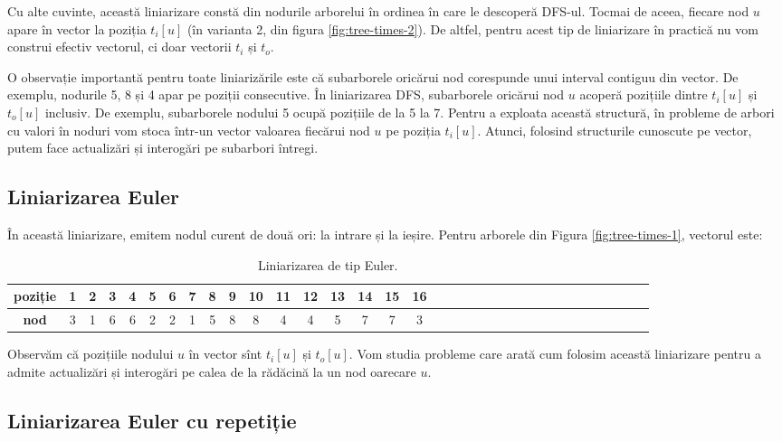 \documentclass[../main.tex]{subfiles}
\begin{document}
Cu alte cuvinte, această liniarizare constă din nodurile arborelui în ordinea în care le descoperă DFS-ul. Tocmai de aceea, fiecare nod $u$ apare în vector la poziția $t_i[u]$ (în varianta 2, din figura \ref{fig:tree-times-2}). De altfel, pentru acest tip de liniarizare în practică nu vom construi efectiv vectorul, ci doar vectorii $t_i$ și $t_o$.

O observație importantă pentru toate liniarizările este că subarborele oricărui nod corespunde unui interval contiguu din vector. De exemplu, nodurile 5, 8 și 4 apar pe poziții consecutive. În liniarizarea DFS, subarborele oricărui nod $u$ acoperă pozițiile dintre $t_i[u]$ și $t_o[u]$ inclusiv. De exemplu, subarborele nodului 5 ocupă pozițiile de la 5 la 7. Pentru a exploata această structură, în probleme de arbori cu valori în noduri vom stoca într-un vector valoarea fiecărui nod $u$ pe poziția $t_i[u]$. Atunci, folosind structurile cunoscute pe vector, putem face actualizări și interogări pe subarbori întregi.

\subsection{Liniarizarea Euler}

În această liniarizare, emitem nodul curent de două ori: la intrare și la ieșire. Pentru arborele din Figura \ref{fig:tree-times-1}, vectorul este:

\begin{table}[!htbp]
  \centering
  \begin{tabular}{ScScScScScScScScScScScScScScScScSc}
    \textbf{poziție} & 1 & 2 & 3 & 4 & 5 & 6 & 7 & 8 & 9 & 10 & 11 & 12 & 13 & 14 & 15 & 16\\
    \hline
    \textbf{nod} & 3 & 1 & 6 & 6 & 2 & 2 & 1 & 5 & 8 & 8 & 4 & 4 & 5 & 7 & 7 & 3\\
  \end{tabular}

  \caption{Liniarizarea de tip Euler.}
\end{table}

Observăm că pozițiile nodului $u$ în vector sînt $t_i[u]$ și $t_o[u]$. Vom studia probleme care arată cum folosim această liniarizare pentru a admite actualizări și interogări pe calea de la rădăcină la un nod oarecare $u$.

\subsection{Liniarizarea Euler cu repetiție}
\end{document}
